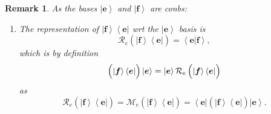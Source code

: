 \documentclass[aps,preprint]{revtex4}
\newtheorem{remark}[theorem]{Remark}
\begin{document}
\begin{remark}
As the bases $\left\vert \boldsymbol{e}\right\rangle $ and $\left\vert 
\boldsymbol{f}\right\rangle $ are conbs:

\begin{enumerate}
\item The representation of $\left\vert \boldsymbol{f}\right\rangle
\left\langle \boldsymbol{e}\right\vert $ wrt the $\left\vert \boldsymbol{e}%
\right\rangle $ basis is 
\begin{equation}
\mathcal{R}_{e}\left( \overset{}{\left\vert \boldsymbol{f}\right\rangle
\left\langle \boldsymbol{e}\right\vert }\right) =\left\langle \left. 
\boldsymbol{e}\right\vert \boldsymbol{f}\right\rangle ,
\end{equation}%
which is by definition 
\begin{equation}
\left( \overset{}{\left\vert \boldsymbol{f}\right\rangle \left\langle 
\boldsymbol{e}\right\vert }\right) \left\vert \boldsymbol{e}\right\rangle
=\left\vert \boldsymbol{e}\right\rangle \mathcal{R}_{e}\left( \overset{}{%
\left\vert \boldsymbol{f}\right\rangle \left\langle \boldsymbol{e}%
\right\vert }\right)
\end{equation}
as 
\begin{equation}
\mathcal{R}_{e}\left( \overset{}{\left\vert \boldsymbol{f}\right\rangle
\left\langle \boldsymbol{e}\right\vert }\right) =\mathcal{M}_{e}\left( 
\overset{}{\left\vert \boldsymbol{f}\right\rangle \left\langle \boldsymbol{e}%
\right\vert }\right) =\left\langle \overset{}{\boldsymbol{e}}\right\vert
\left( \overset{}{\left\vert \boldsymbol{f}\right\rangle \left\langle 
\boldsymbol{e}\right\vert }\right) \left\vert \overset{}{\boldsymbol{e}}%
\right\rangle .
\end{equation}


\end{enumerate}
\end{remark}
\end{document}
